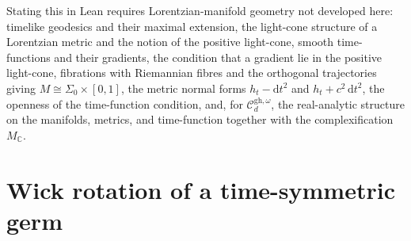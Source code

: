 \begin{definition}
  Stating this in Lean requires Lorentzian-manifold geometry not developed here:
  timelike geodesics and their maximal extension, the light-cone structure of a
  Lorentzian metric and the notion of the positive light-cone, smooth time-functions
  and their gradients, the condition that a gradient lie in the positive light-cone,
  fibrations with Riemannian fibres and the orthogonal trajectories giving
  $M \cong \Sigma_0 \times [0,1]$, the metric normal forms $h_t - \mathrm{d}t^2$ and
  $h_t + c^2\,\mathrm{d}t^2$, the openness of the time-function condition, and, for
  $\mathcal C_d^{\mathrm{gh},\omega}$, the real-analytic structure on the manifolds,
  metrics, and time-function together with the complexification $M_{\mathbb C}$.
\end{definition}

\section{Wick rotation of a time-symmetric germ}


